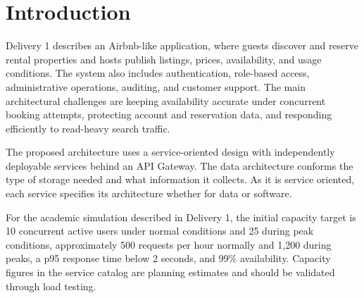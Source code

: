 \section{Introduction}


Delivery 1 describes an Airbnb-like application, where guests discover and reserve rental properties and hosts publish listings, prices, availability, and usage conditions. The system also includes authentication, role-based access, administrative operations, auditing, and customer support. The main architectural challenges are keeping availability accurate under concurrent booking attempts, protecting account and reservation data, and responding efficiently to read-heavy search traffic.

The proposed architecture uses a service-oriented design with independently deployable services behind an API Gateway. The data architecture conforms the type of storage needed and what information it collects. As it is service oriented, each service specifies its architecture whether for data or software.

For the academic simulation described in Delivery 1, the initial capacity target is 10 concurrent active users under normal conditions and 25 during peak conditions, approximately 500 requests per hour normally and 1,200 during peaks, a p95 response time below 2 seconds, and 99\% availability. Capacity figures in the service catalog are planning estimates and should be validated through load testing.  
